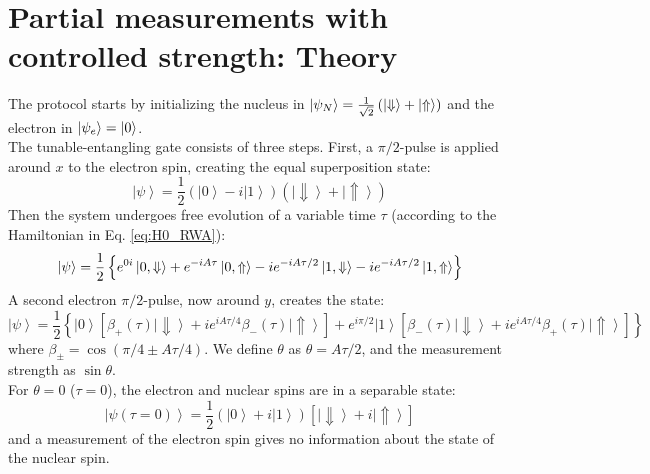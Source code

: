 \section*{Partial measurements with controlled strength: Theory}
\label{sec:theory}
The protocol starts by initializing the nucleus in $\left|\psi_N\right> = \frac{1}{\sqrt{2}} \left( \left|\Downarrow\right>+\left|\Uparrow\right> \right)$ and the electron in $\left|\psi_e\right> = \left|0\right>$.\\
The tunable-entangling gate consists of three steps. First, a $\pi/2$-pulse is applied around $x$ to the electron spin, creating the equal superposition state:
\begin{equation}
\left| \psi \right \rangle = \frac{1}{2} \left( \left| 0 \right \rangle - i \left| 1 \right \rangle \right) \left( \left| \Downarrow \right \rangle +\left| \Uparrow \right \rangle\right)
\end{equation}
Then the system undergoes free evolution of a variable time $\tau$ (according to the Hamiltonian in Eq. \ref{eq:H0_RWA}):
\begin{equation}
\left| \psi\right> = \frac{1}{2} \left \lbrace e^{0i} \left| 0, \Downarrow \right> + e^{-i A \tau} \left| 0, \Uparrow \right> - i  e^{-i A \tau/2} \left| 1, \Downarrow \right> - i  e^{-i A \tau/2} \left| 1, \Uparrow\right> \right \rbrace
\end{equation}
A second electron $\pi/2$-pulse, now around $y$, creates the state:
\begin{equation}
\left| \psi \right \rangle = \frac{1}{2} \left\lbrace \left| 0 \right \rangle \left[ \beta_+ (\tau) \left| \Downarrow \right \rangle + i e^{i A\tau/4} \beta_-(\tau) \left| \Uparrow \right \rangle \right] + e^{i\pi /2} \left| 1 \right \rangle \left[ \beta_-(\tau) \left| \Downarrow \right \rangle + i e^{i A\tau/4} \beta_+(\tau) \left| \Uparrow \right \rangle \right] \right\rbrace
\label{eq:state}
\end{equation}
where $\beta_{\pm} = \cos(\pi/4 \pm  A \tau/4)$. We define $\theta$ as $\theta= A \tau/2$, and the measurement strength as $\sin\theta$.\\
For $\theta=0$ ($\tau = 0$), the electron and nuclear spins are in a separable state:
\begin{equation}
\left| \psi (\tau=0) \right \rangle = \frac{1}{2} \left( \left| 0 \right \rangle +i \left| 1 \right \rangle \right) \left[ \left| \Downarrow \right \rangle +  i \left| \Uparrow \right \rangle \right]
\end{equation}
and a measurement of the electron spin gives no information about the state of the nuclear spin.
